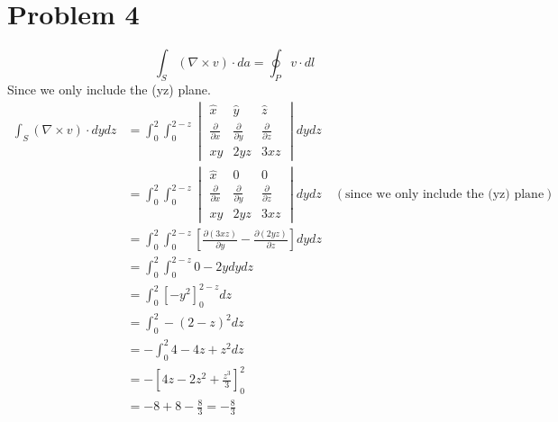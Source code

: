 \documentclass[12pt]{article}
\begin{document}
\section*{Problem 4}
\[\int_{S}^{} (\nabla \times v) \cdot da = \oint_P v \cdot dl\]
Since we only include the (yz) plane.
\begin{align*}
	\int_{S}^{} (\nabla \times v) \cdot dydz &= \int_{0}^{2} \int_{0}^{2-z} \begin{vmatrix}
		\hat{x} & \hat{y} & \hat{z} \\
		\frac{\partial}{\partial x} & \frac{\partial}{\partial y} & \frac{\partial}{\partial z} \\
		xy & 2yz & 3xz
	\end{vmatrix} dy dz \\
	&= \int_{0}^{2} \int_{0}^{2-z} \begin{vmatrix}
		\hat{x} & 0 & 0 \\
		\frac{\partial}{\partial x} & \frac{\partial}{\partial y} & \frac{\partial}{\partial z} \\
		xy & 2yz & 3xz
	\end{vmatrix} dy dz \quad (\text{since we only include the (yz) plane}) \\
	&= \int_{0}^{2} \int_{0}^{2-z} \left[\frac{\partial(3xz)}{\partial y} - \frac{\partial(2yz)}{\partial z}\right] dy dz \\
	&= \int_{0}^{2} \int_{0}^{2-z} 0 - 2y dy dz \\
	&= \int_{0}^{2} \left[-y^2\right]_{0}^{2-z} dz \\
	&= \int_{0}^{2} -(2-z)^2 dz \\
	&= - \int_{0}^{2} 4 - 4z + z^2 dz \\
	&= - \left[4z - 2z^2 + \frac{z^3}{3}\right]_{0}^{2} \\
	&= -8 + 8 - \frac{8}{3} = -\frac{8}{3}
\end{align*}
\end{document}
